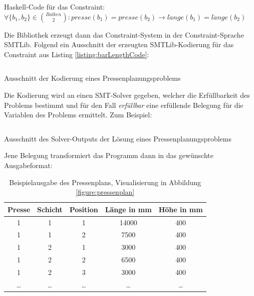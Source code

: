 \begin{listing}[H]
    \inputminted[linenos=true]{haskell}{Code/Einleitung/PressenlängeConstraintHaskell.hs}
    \caption{Haskell-Code für das Constraint: $ \forall \{b_1, b_2\} \in \binom{Balken}{2}: presse(b_1) = presse(b_2) \rightarrow l\ddot ange(b_1) = l\ddot ange(b_2) $}
    \label{listing:barLengthCode}
\end{listing}

Die Bibliothek erzeugt dann das Constraint-System in der Constraint-Sprache SMTLib.
Folgend ein Ausschnitt der erzeugten SMTLib-Kodierung für das Constraint aus Listing \ref{listing:barLengthCode}:

\begin{listing}[H]
    \inputminted{bash}{Code/Einleitung/PressenlängeConstraintSMTLib.smt2}
    \caption{Ausschnitt der Kodierung eines Pressenplanungsproblems}
    \label{listing:barLengthSMTlib}
\end{listing}

Die Kodierung wird an einen SMT-Solver gegeben, welcher die Erfüllbarkeit des Problems bestimmt und für den Fall \textit{erfüllbar} eine erfüllende Belegung für die Variablen des Problems ermittelt.
Zum Beispiel:

\begin{listing}[H]
    \inputminted[linenos=true]{bash}{Code/Einleitung/PressenlängeConstraintSolverOutput.smt2}
    \caption{Ausschnitt des Solver-Outputs der Lösung eines Pressenplanungsproblems}
    \label{listing:barLengthSolverOutput}
\end{listing}

Jene Belegung transformiert das Programm dann in das gewünschte Ausgabeformat:

\begin{table}[H]
    \centering
    \begin{tabular}{|c|c|c|c|c|}
        \hline
        \textbf{Presse} & \textbf{Schicht} & \textbf{Position} & \textbf{Länge in mm} & \textbf{Höhe in mm} \\
        \hline
        1 & 1 & 1 & 14000 & 400 \\
        1 & 1 & 2 & 7500 & 400 \\
        1 & 2 & 1 & 3000 & 400 \\
        1 & 2 & 2 & 6500 & 400 \\
        1 & 2 & 3 & 3000 & 400 \\
        \ldots & \ldots & \ldots & \ldots & \ldots \\
        \hline
    \end{tabular}
    \caption{Beispielausgabe des Pressenplans, Visualisierung in Abbildung \ref{figure:pressenplan}}
    \label{table:pressenplan}
\end{table}

